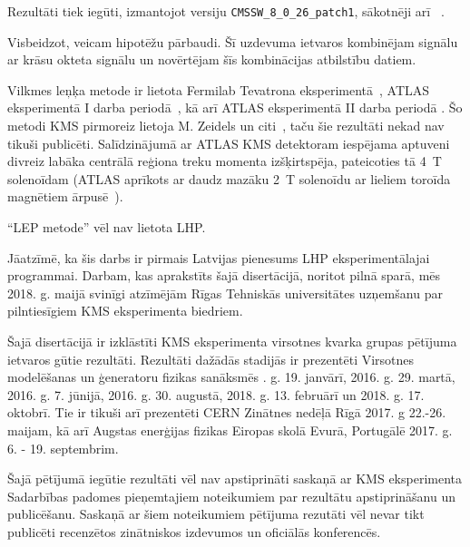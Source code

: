 Rezultāti tiek iegūti, izmantojot \CMSSW versiju \lstinline[language=sh]|CMSSW_8_0_26_patch1|, sākotnēji arī \RIVET~\cite{Buckley:2010ar}.

Visbeidzot, veicam hipotēžu pārbaudi. Šī uzdevuma ietvaros kombinējam \ttbar signālu ar krāsu okteta \PW signālu un novērtējam šīs kombinācijas atbilstību datiem.

{}

Vilkmes leņķa metode ir lietota Fermilab Tevatrona \DZERO eksperimentā~\cite{Abazov:2011vh}, ATLAS eksperimentā I darba periodā~\cite{Aad:2015lxa}, kā arī ATLAS eksperimentā II darba periodā \cite{Aaboud:2018ibj}. Šo metodi KMS pirmoreiz lietoja M. Zeidels un citi~\cite{indico:Markus_cf}, taču šie rezultāti nekad nav tikuši publicēti. Salīdzinājumā ar ATLAS KMS detektoram iespējama aptuveni divreiz labāka centrālā reģiona treku momenta izšķirtspēja, pateicoties tā 4~T solenoīdam (ATLAS aprīkots ar daudz mazāku 2~T solenoīdu ar lieliem toroīda magnētiem ārpusē~\cite{Aad:2008zzm}).

``LEP metode'' vēl nav lietota LHP.

Jāatzīmē, ka šis darbs ir pirmais Latvijas pienesums LHP eksperimentālajai programmai. Darbam, kas aprakstīts šajā disertācijā, noritot pilnā sparā, mēs 2018. g. maijā svinīgi atzīmējām Rīgas Tehniskās universitātes uzņemšanu par pilntiesīgiem KMS eksperimenta biedriem.

{}


Šajā disertācijā ir izklāstīti KMS eksperimenta virsotnes kvarka grupas pētījuma ietvaros gūtie rezultāti. Rezultāti dažādās stadijās ir prezentēti Virsotnes modelēšanas un ģeneratoru fizikas sanāksmēs . g. 19. janvārī, 2016. g. 29. martā, 2016. g. 7. jūnijā, 2016. g. 30. augustā, 2018. g. 13. februārī un 2018. g. 17. oktobrī. Tie ir tikuši arī prezentēti CERN Zinātnes nedēļā Rīgā 2017. g 22.-26. maijam, kā arī Augstas enerģijas fizikas Eiropas skolā Evurā, Portugālē 2017. g. 6. - 19. septembrim.

Šajā pētījumā iegūtie rezultāti vēl nav apstiprināti saskaņā ar KMS eksperimenta Sadarbības padomes pieņemtajiem noteikumiem par rezultātu apstiprināšanu un publicēšanu. Saskaņā ar šiem noteikumiem pētījuma rezutāti vēl nevar tikt publicēti recenzētos zinātniskos izdevumos un oficiālās konferencēs.
